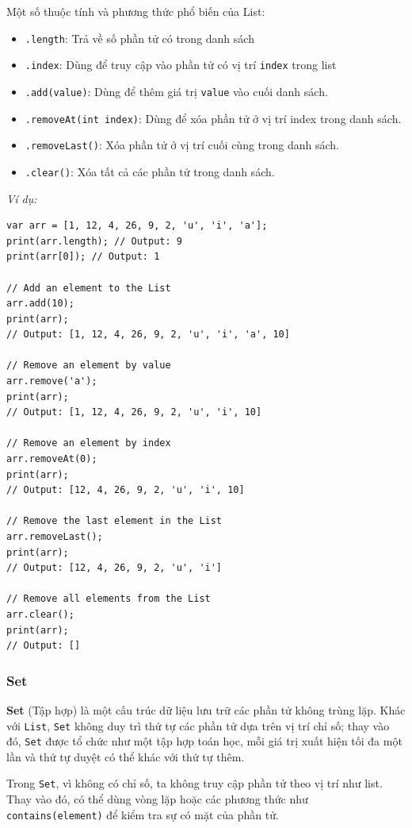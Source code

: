 \documentclass[../DoAn.tex]{subfiles}
\numberwithin{figure}{chapter}
\begin{document}
Một số thuộc tính và phương thức phổ biến của List: 
\begin{itemize}
\item \texttt{.length}: Trả về số phần tử có trong danh sách
\item \texttt{.index}: Dùng để truy cập vào phần tử có vị trí \texttt{index} trong list
\item \texttt{.add(value)}: Dùng để thêm giá trị \texttt{value} vào cuối danh sách.
\item \texttt{.removeAt(int index)}: Dùng để xóa phần tử ở vị trí index trong danh sách.
\item \texttt{.removeLast()}: Xóa phần tử ở vị trí cuối cùng trong danh sách.
\item \texttt{.clear()}: Xóa tất cả các phần tử trong danh sách.
\end{itemize}

\textit{Ví dụ:} 
\begin{lstlisting}
var arr = [1, 12, 4, 26, 9, 2, 'u', 'i', 'a'];
print(arr.length); // Output: 9
print(arr[0]); // Output: 1

// Add an element to the List
arr.add(10);
print(arr);
// Output: [1, 12, 4, 26, 9, 2, 'u', 'i', 'a', 10]

// Remove an element by value
arr.remove('a');
print(arr);
// Output: [1, 12, 4, 26, 9, 2, 'u', 'i', 10]

// Remove an element by index
arr.removeAt(0);
print(arr);
// Output: [12, 4, 26, 9, 2, 'u', 'i', 10]

// Remove the last element in the List
arr.removeLast();
print(arr);
// Output: [12, 4, 26, 9, 2, 'u', 'i']

// Remove all elements from the List
arr.clear();
print(arr);
// Output: []
\end{lstlisting}
\subsubsection{Set}
\textbf{Set} (Tập hợp) là một cấu trúc dữ liệu lưu trữ các phần tử không trùng lặp. Khác với \texttt{List}, \texttt{Set} không duy trì thứ tự các phần tử dựa trên vị trí chỉ số; thay vào đó, \texttt{Set} được tổ chức như một tập hợp toán học, mỗi giá trị xuất hiện tối đa một lần và thứ tự duyệt có thể khác với thứ tự thêm. 

Trong \texttt{Set}, vì không có chỉ số, ta không truy cập phần tử theo vị trí như list. Thay vào đó, có thể dùng vòng lặp hoặc các phương thức như \texttt{contains(element)} để kiểm tra sự có mặt của phần tử. 
\end{document}
